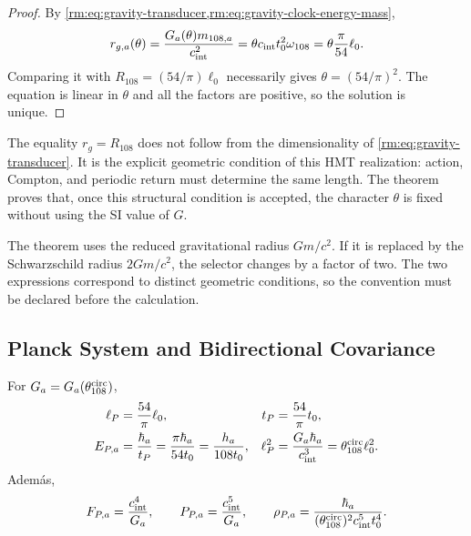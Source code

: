 \begin{proof}
By \cref{rm:eq:gravity-transducer,rm:eq:gravity-clock-energy-mass},
\[
r_{g,a}(\theta)
=\frac{G_a(\theta)m_{108,a}}{c_{\rm int}^2}
=\theta c_{\rm int}t_0^2\omega_{108}
=\theta\frac{\pi}{54}\ell_0.
\]
Comparing it with
\(R_{108}=(54/\pi)\ell_0\) necessarily gives
\(\theta=(54/\pi)^2\). The equation is linear in \(\theta\) and all the
factors are positive, so the solution is unique.
\end{proof}

The equality \(r_g=R_{108}\) does not follow from the dimensionality of \cref{rm:eq:gravity-transducer}. It is the explicit geometric condition of this HMT realization: action, Compton, and periodic return must determine the same length. The theorem proves that, once this structural condition is accepted, the character \(\theta\) is fixed without using the SI value of \(G\).

\begin{remark}
The theorem uses the reduced gravitational radius \(Gm/c^2\). If it is replaced
by the Schwarzschild radius \(2Gm/c^2\), the selector changes by a factor of
two. The two expressions correspond to distinct geometric conditions,
so the convention must be declared before the calculation.
\end{remark}

\subsection{Planck System and Bidirectional Covariance}

\begin{corollary}
\label{rm:cor:gravity-planck-family}
For \(G_a=G_a(\theta_{108}^{\rm circ})\),
\begin{align}
\ell_P&=\frac{54}{\pi}\ell_0,
&t_P&=\frac{54}{\pi}t_0,
\label{rm:eq:gravity-planck-length-time}\\
E_{P,a}&=\frac{\hbar_a}{t_P}
=\frac{\pi\hbar_a}{54t_0}
=\frac{h_a}{108t_0},
&\ell_P^2&=\frac{G_a\hbar_a}{c_{\rm int}^3}
=\theta_{108}^{\rm circ}\ell_0^2.
\label{rm:eq:gravity-planck-energy-area}
\end{align}
Adem\'as,
\begin{equation}
\label{rm:eq:gravity-planck-force-power-density}
F_{P,a}=\frac{c_{\rm int}^4}{G_a},
\qquad
P_{P,a}=\frac{c_{\rm int}^5}{G_a},
\qquad
\rho_{P,a}=\frac{\hbar_a}
{(\theta_{108}^{\rm circ})^2c_{\rm int}^5t_0^4}.
\end{equation}
\end{corollary}

